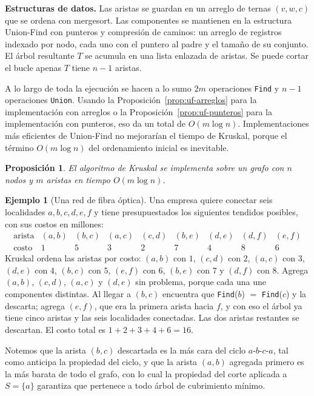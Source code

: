 \documentclass[12pt, spanish, oneside, openany]{book}
\newenvironment{estructuras}%
  {\begin{center}\begin{minipage}{0.93\textwidth}\begin{mdframed}[style=estrbox]%
   \small\textbf{Estructuras de datos.}\;}%
  {\end{mdframed}\end{minipage}\end{center}}
\theoremstyle{uprightplain}
\newtheorem{proposicion}[teorema]{Proposición}
\theoremstyle{definition}
\newtheorem{ejemplo}[teorema]{Ejemplo}
\theoremstyle{remark}
\theoremstyle{definition}
\begin{document}
\begin{estructuras}
Las aristas se guardan en un arreglo de ternas $(v,w,c)$ que se ordena con
mergesort. Las componentes se mantienen en la estructura Union-Find con
punteros y compresión de caminos: un arreglo de registros indexado por nodo,
cada uno con el puntero al padre y el tamaño de su conjunto. El árbol
resultante $T$ se acumula en una lista enlazada de aristas. Se puede cortar el
bucle apenas $T$ tiene $n-1$ aristas.
\end{estructuras}

A lo largo de toda la ejecución se hacen a lo sumo $2m$ operaciones \texttt{Find} y $n-1$ operaciones \texttt{Union}. Usando la Proposición~\ref{prop:uf-arreglos} para la implementación con arreglos o la Proposición~\ref{prop:uf-punteros} para la implementación con punteros, eso da un total de $O(m\log n)$. Implementaciones más eficientes de Union-Find no mejorarían el tiempo de Kruskal, porque el término $O(m\log n)$ del ordenamiento inicial es inevitable.

\begin{proposicion}
\label{prop:kruskal-tiempo}
El algoritmo de Kruskal se implementa sobre un grafo con $n$ nodos y $m$ aristas en tiempo $O(m\log n)$.
\end{proposicion}

\begin{ejemplo}[Una red de fibra óptica]
\label{ej:kruskal-fibra}
Una empresa quiere conectar seis localidades $a,b,c,d,e,f$ y tiene presupuestados los siguientes tendidos posibles, con sus costos en millones:
\[
\begin{array}{c|cccccccc}
\text{arista} & (a,b) & (b,c) & (a,c) & (c,d) & (b,e) & (d,e) & (d,f) & (e,f)\\\hline
\text{costo} & 1 & 5 & 3 & 2 & 7 & 4 & 8 & 6
\end{array}
\]
Kruskal ordena las aristas por costo: $(a,b)$ con $1$, $(c,d)$ con $2$, $(a,c)$ con $3$, $(d,e)$ con $4$, $(b,c)$ con $5$, $(e,f)$ con $6$, $(b,e)$ con $7$ y $(d,f)$ con $8$. Agrega $(a,b)$, $(c,d)$, $(a,c)$ y $(d,e)$ sin problema, porque cada una une componentes distintas. Al llegar a $(b,c)$ encuentra que \texttt{Find}($b$) $=$ \texttt{Find}($c$) y la descarta; agrega $(e,f)$, que era la primera arista hacia $f$, y con eso el árbol ya tiene cinco aristas y las seis localidades conectadas. Las dos aristas restantes se descartan. El costo total es $1+2+3+4+6=16$.

Notemos que la arista $(b,c)$ descartada es la más cara del ciclo $a$-$b$-$c$-$a$, tal como anticipa la propiedad del ciclo, y que la arista $(a,b)$ agregada primero es la más barata de todo el grafo, con lo cual la propiedad del corte aplicada a $S=\{a\}$ garantiza que pertenece a todo árbol de cubrimiento mínimo.
\end{ejemplo}
\end{document}
